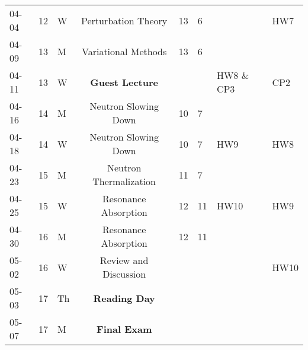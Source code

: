 \documentclass[11pt, a4paper]{article}
\begin{document}
\begin{table}[h]
\begin{center}
\begin{tabular}{lllcllll}
04-04 & 12 & W & Perturbation Theory & 13 & 6 &  & HW7\\
04-09 & 13 & M & Variational Methods & 13 & 6 & & \\
04-11 & 13 & W & \textbf{Guest Lecture} &  &  & HW8 \& CP3 & CP2\\
04-16 & 14 & M & Neutron Slowing Down & 10 &7 &  & \\
04-18 & 14 & W & Neutron Slowing Down & 10 & 7 & HW9 & HW8\\
04-23 & 15 & M & Neutron Thermalization & 11 & 7 &  & \\
04-25 & 15 & W & Resonance Absorption & 12 & 11 & HW10 & HW9 \\
04-30 & 16 & M & Resonance Absorption &  12 & 11 &  & \\
05-02 & 16 & W & Review and Discussion & &  &  & HW10\\
05-03 & 17 & Th & \textbf{Reading Day} &  &  &  & \\
05-07 & 17 & M & \textbf{Final Exam} &  &  &  & \\
\end{tabular}
\end{center}
\end{table}
\end{document}

